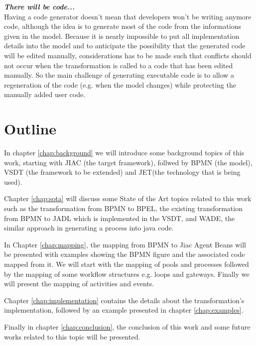 \textbf{\textit{There will be code...} }\\
Having a code generator doesn't mean that developers won't be writing anymore code, although the idea is to generate most of the code from the informations given in the model. Because it is nearly impossible to put all implementation details into the model and to anticipate the possibility that the generated code will be edited manually, considerations has to be made such that conflicts should not occur when the transformation is called to a code that has been edited manually. So the main challenge of generating executable code is to allow a regeneration of the code (e.g. when the model changes) while protecting the manually added user code. 


\section{Outline}
In chapter \ref{chap:background} we will introduce some background topics of this work, starting with JIAC (the target framework), follwed by BPMN (the model), VSDT (the framework to be extended) and JET(the technology that is being used).

Chapter \ref{chap:sota} will discuss some State of the Art topics related to this work such as the transformation from BPMN to BPEL, the existing transformation from BPMN to JADL which is implemented in the VSDT, and WADE, the similar approach in generating a process into java code.

In Chapter \ref{chap:mapping}, the mapping from BPMN to Jiac Agent Beans will be presented with examples showing the BPMN figure and the associated code mapped from it. We will start with the mapping of pools and processes followed by the mapping of some workflow structures e.g. loops and gateways. Finally we will present the mapping of activities and events.

Chapter \ref{chap:implementation} contains the details about the transformation's implementation, followed by an example presented in chapter \ref{chap:examples}. 

Finally in chapter \ref{chap:conclusion}, the conclusion of this work and some future works related to this topic will be presented.